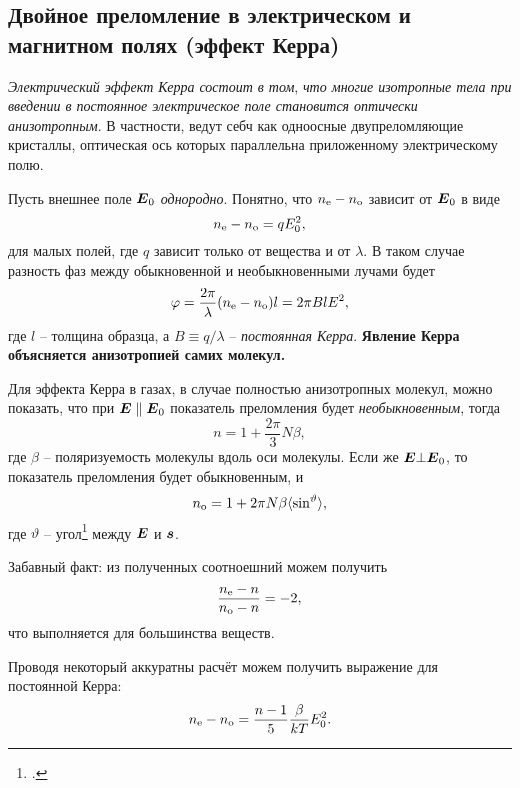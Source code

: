 

\subsection{Двойное преломление в электрическом и магнитном полях (эффект Керра)}

\textit{Электрический эффект Керра состоит в том}, \textit{что многие изотропные тела при введении в постоянное электрическое поле становится оптически анизотропным}. В частности, ведут себч как одноосные двупреломляющие кристаллы, оптическая ось которых параллельна приложенному электрическому полю. 


Пусть внешнее поле $\mbox{\boldmath $E$}_0$ \textit{однородно}. Понятно, что $n_{\textnormal{e}}-n_{\textnormal{o}}$ зависит от $\mbox{\boldmath $E$}_0$ в виде
\begin{equation*}
    n_{\textnormal{e}} - n_{\textnormal{o}} = q E_0^2,
\end{equation*}
для малых полей, где $q$ зависит только от вещества и от $\lambda$. В таком случае разность фаз между обыкновенной и необыкновенными лучами будет
\begin{equation*}
    \varphi = \frac{2\pi}{\lambda}(n_{\textnormal{e}} - n_{\textnormal{o}}) l = 2 \pi B l E^2,
\end{equation*}
где $l$ -- толщина образца, а $B \equiv q/\lambda$ -- \textit{постоянная Керра}. \textbf{Явление Керра объясняется анизотропией самих молекул.} 

Для эффекта Керра в газах, в случае полностью анизотропных молекул, можно показать, что при $\mbox{\boldmath $E$} \parallel \mbox{\boldmath $E$}_0$ показатель преломления будет \textit{необыкновенным}, тогда
\begin{equation*}
    n = 1 + \frac{2\pi}{3} N \beta,
\end{equation*}
где $\beta$ -- поляризуемость молекулы вдоль оси молекулы. Если же $\mbox{\boldmath $E$} \bot \mbox{\boldmath $E$}_0$, то  показатель преломления будет обыкновенным, и
\begin{equation*}
    n_{\textnormal{o}} = 1 + 2 \pi N \beta \langle \sin^ \vartheta \rangle,
\end{equation*}
где $\vartheta$ -- угол\footnote{
    .
}  между $\mbox{\boldmath $E$}$ и $\mbox{\boldmath $s$}$.

Забавный факт: из полученных соотноешний можем получить
\begin{equation*}
    \frac{n_{\textnormal{e}}-n}{n_{\textnormal{o}}-n} = -2,
\end{equation*}
что выполняется для большинства веществ. 


Проводя некоторый аккуратны расчёт можем получить выражение для постоянной Керра:
\begin{equation*}
    n_{\textnormal{e}} - n_{\textnormal{o}} = \frac{n-1}{5} \frac{\beta}{kT} E_0^2.
\end{equation*}
